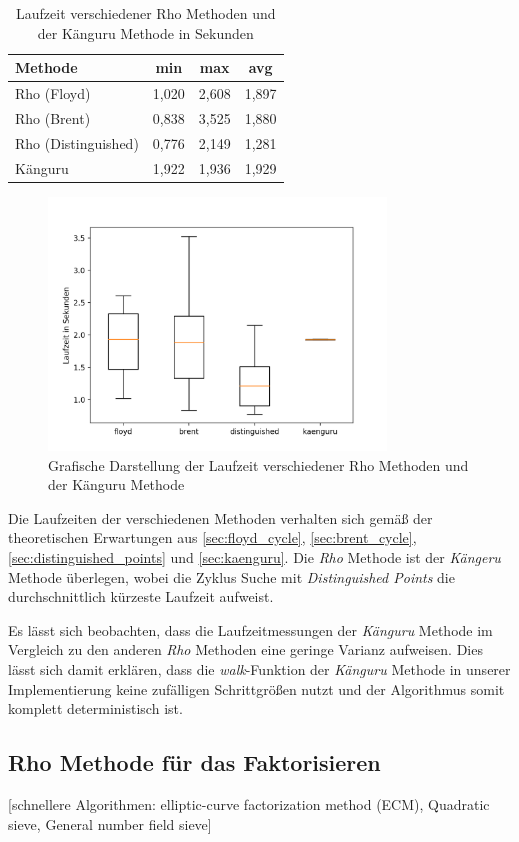 \documentclass{scrartcl}
\begin{document}
\begin{table}[h]
  \centering
  \begin{tabular}{l|c|c|c}
    Methode             & min   & max   & avg   \\ \hline
    Rho (Floyd)         & 1,020 & 2,608 & 1,897  \\ \hline
    Rho (Brent)         & 0,838 & 3,525 & 1,880 \\ \hline
    Rho (Distinguished) & 0,776 & 2,149 & 1,281 \\ \hline
    Känguru             & 1,922 & 1,936 & 1,929
    \end{tabular}
  \caption{Laufzeit verschiedener Rho Methoden und der Känguru Methode in Sekunden}
  \label{tab:benchmark}
\end{table}

\begin{figure}[h]
  \centering
  \includegraphics[width=0.8\textwidth]{../projekt/benchmark/plot.png}
  \caption{Grafische Darstellung der Laufzeit verschiedener Rho Methoden und der Känguru Methode}
  \label{fig:benchmark}
\end{figure}

Die Laufzeiten der verschiedenen Methoden verhalten sich gemäß der
theoretischen Erwartungen aus \ref{sec:floyd_cycle},
\ref{sec:brent_cycle}, \ref{sec:distinguished_points} und
\ref{sec:kaenguru}.
Die \emph{Rho} Methode ist der \emph{Kängeru} Methode überlegen,
wobei die Zyklus Suche mit \emph{Distinguished Points} die durchschnittlich
kürzeste Laufzeit aufweist.

Es lässt sich beobachten, dass die Laufzeitmessungen der \emph{Känguru}
Methode im Vergleich zu den anderen \emph{Rho} Methoden eine geringe Varianz
aufweisen.
Dies lässt sich damit erklären, dass die \emph{walk}-Funktion der
\emph{Känguru} Methode in unserer Implementierung keine zufälligen
Schrittgrößen nutzt und der Algorithmus somit komplett deterministisch
ist.

\subsection{Rho Methode für das Faktorisieren}
\label{sec:rho_faktorisieren}

[schnellere Algorithmen: elliptic-curve factorization method (ECM), Quadratic sieve, General number field sieve]

\cite{Pollard1975}

\newpage
\printbibliography[heading=bibintoc]
\end{document}
